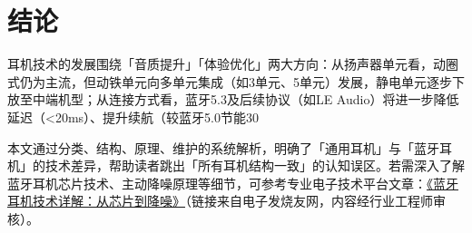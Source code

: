 \documentclass[UTF8]{ctexart}
\begin{document}
\section{结论}
耳机技术的发展围绕「音质提升」「体验优化」两大方向：从扬声器单元看，动圈式仍为主流，但动铁单元向多单元集成（如3单元、5单元）发展，静电单元逐步下放至中端机型；从连接方式看，蓝牙5.3及后续协议（如LE Audio）将进一步降低延迟（<20ms）、提升续航（较蓝牙5.0节能30%

本文通过分类、结构、原理、维护的系统解析，明确了「通用耳机」与「蓝牙耳机」的技术差异，帮助读者跳出「所有耳机结构一致」的认知误区。若需深入了解蓝牙耳机芯片技术、主动降噪原理等细节，可参考专业电子技术平台文章：\href{https://www.elecfans.com/d/1109530.html}{《蓝牙耳机技术详解：从芯片到降噪》}（链接来自电子发烧友网，内容经行业工程师审核）。
\end{document}
